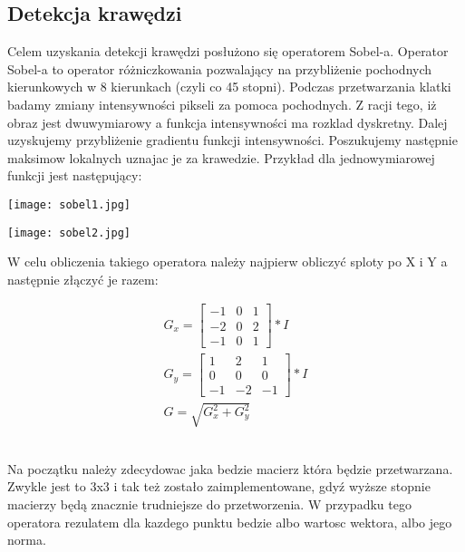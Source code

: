 \documentclass{article}
\begin{document}
\subsection{Detekcja krawędzi}
Celem uzyskania detekcji krawędzi posłużono się operatorem Sobel-a.
Operator Sobel-a to operator różniczkowania pozwalający na przybliżenie pochodnych kierunkowych w 8 kierunkach (czyli co 45 stopni).
Podczas przetwarzania klatki badamy zmiany intensywności pikseli za pomoca pochodnych. Z racji tego, iż obraz jest dwuwymiarowy a funkcja intensywności ma rozklad dyskretny. Dalej uzyskujemy przybliżenie gradientu funkcji intensywności. Poszukujemy następnie maksimow lokalnych uznajac je za krawedzie. Przykład dla jednowymiarowej funkcji jest następujący:
\begin{center}
    \texttt{[image: sobel1.jpg]}
\end{center}
\begin{center}
    \texttt{[image: sobel2.jpg]}
\end{center}

W celu obliczenia takiego operatora należy najpierw obliczyć sploty po X i Y a następnie złączyć je razem: \\
\begin{center}
    \begin{align*}
 G_x = \left[
        \begin{array}{ccc}
         -1 & 0 & 1\\
         -2 & 0 & 2\\
         -1 & 0 & 1
         \end{array}
      \right]
      * I
      \\
      G_y = \left[
        \begin{array}{ccc}
          1 & 2 & 1\\
          0 & 0 & 0\\
         -1 & -2 & -1
         \end{array}
      \right]
      * I
      \\
      G= \sqrt{G_x^2 + G_y^2}
\end{align*}
\end{center}
\\
Na początku należy zdecydowac jaka bedzie macierz która będzie przetwarzana. Zwykle jest to 3x3 i tak też zostało zaimplementowane, gdyź wyższe stopnie macierzy będą znacznie trudniejsze do przetworzenia. W przypadku tego operatora rezulatem dla kazdego punktu bedzie albo wartosc wektora, albo jego norma.\\
\end{document}
